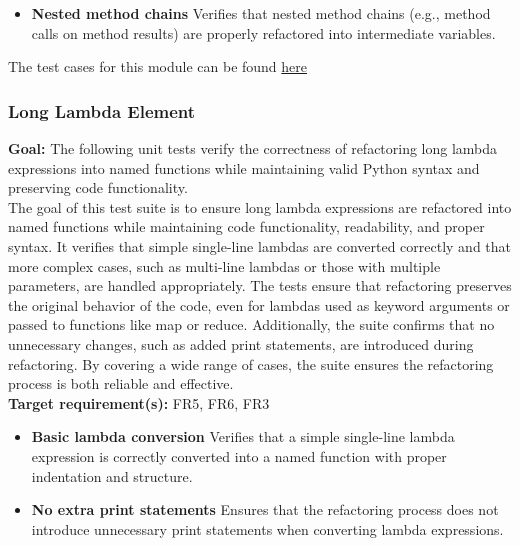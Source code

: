 \documentclass[12pt, titlepage]{article}
\begin{document}
\begin{enumerate}[label={\bf \textcolor{Maroon}{test-SRT-\arabic*}}, wide=0pt, font=\itshape]
\begin{itemize}
    \item \textbf{Nested method chains} \newline
    Verifies that nested method chains (e.g., method calls on method results) are properly refactored into intermediate variables.
\end{itemize}

\noindent The test cases for this module can be found \href{https://github.com/ssm-lab/capstone--source-code-optimizer/blob/new-poc/tests/refactorers/test_long_element_chain.py}{here}

\subsubsection{Long Lambda Element}

\textbf{Goal:} The following unit tests verify the correctness of refactoring long lambda expressions into named functions while maintaining valid Python syntax and preserving code functionality.\\

\noindent The goal of this test suite is to ensure long lambda expressions are refactored into named 
functions while maintaining code functionality, readability, and proper syntax. It verifies 
that simple single-line lambdas are converted correctly and that more complex cases, such as 
multi-line lambdas or those with multiple parameters, are handled appropriately. The tests 
ensure that refactoring preserves the original behavior of the code, even for lambdas used 
as keyword arguments or passed to functions like map or reduce. Additionally, the suite 
confirms that no unnecessary changes, such as added print statements, are introduced during 
refactoring. By covering a wide range of cases, the suite ensures the refactoring process
 is both reliable and effective.\\

\noindent \textbf{Target requirement(s):} FR5, FR6, FR3 ~\cite{SRS} \\

\begin{itemize}
    \item \textbf{Basic lambda conversion} \newline
    Verifies that a simple single-line lambda expression is correctly converted into a named function with proper indentation and structure.

    \item \textbf{No extra print statements} \newline
    Ensures that the refactoring process does not introduce unnecessary print statements when converting lambda expressions.


\end{itemize}
\end{enumerate}
\end{document}
